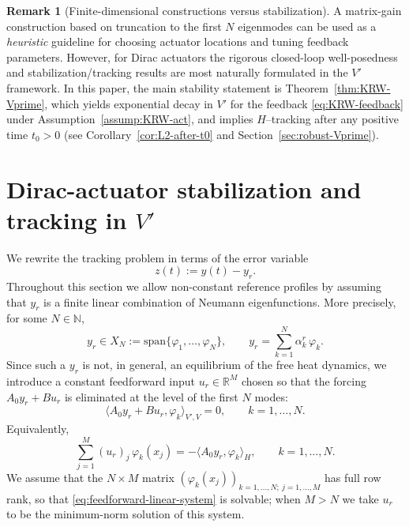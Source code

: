 \documentclass[11pt,a4paper]{article}
\numberwithin{equation}{section}
\theoremstyle{definition}
\newtheorem{remark}[theorem]{Remark}
\newcommand{\R}{\mathbb{R}}
\newcommand{\N}{\mathbb{N}}
\newcommand{\1}{\mathbbm{1}}
\begin{document}

\begin{remark}[Finite-dimensional constructions versus stabilization]
\label{rem:finite-vs-krw}
A matrix-gain construction based on truncation to the first $N$ eigenmodes can be used as a
\emph{heuristic} guideline for choosing actuator locations and tuning feedback parameters.
However, for Dirac actuators the rigorous closed-loop well-posedness and stabilization/tracking
results are most naturally formulated in the $V'$ framework. In this paper, the main stability
statement is Theorem~\ref{thm:KRW-Vprime}, which yields exponential decay in $V'$ for the
feedback \eqref{eq:KRW-feedback} under Assumption~\ref{assump:KRW-act}, and implies $H$--tracking
after any positive time $t_0>0$ (see Corollary~\ref{cor:L2-after-t0} and Section~\ref{sec:robust-Vprime}).
\end{remark}

\section{Dirac-actuator stabilization and tracking in $V'$}
\label{sec:stab-KRW}
\noindent
We rewrite the tracking problem in terms of the error variable
\[
z(t):=y(t)-y_r.
\]
Throughout this section we allow non-constant reference profiles by assuming that $y_r$ is a finite
linear combination of Neumann eigenfunctions. More precisely, for some $N\in\N$,
\begin{equation}
\label{eq:ref-finite-modes}
y_r\in X_N:=\mathrm{span}\{\varphi_1,\dots,\varphi_N\},\qquad
y_r=\sum_{k=1}^N \alpha_k^r\,\varphi_k.
\end{equation}
Since such a $y_r$ is not, in general, an equilibrium of the free heat dynamics, we introduce a constant
feedforward input $u_r\in\R^M$ chosen so that the forcing $A_0y_r+Bu_r$ is eliminated at the level of
the first $N$ modes:
\begin{equation}
\label{eq:feedforward-moment}
\langle A_0 y_r + Bu_r,\varphi_k\rangle_{V',V}=0,\qquad k=1,\dots,N.
\end{equation}
Equivalently,
\begin{equation}
\label{eq:feedforward-linear-system}
\sum_{j=1}^M (u_r)_j\,\varphi_k(x_j) = -\langle A_0 y_r,\varphi_k\rangle_H,\qquad k=1,\dots,N.
\end{equation}
We assume that the $N\times M$ matrix $(\varphi_k(x_j))_{k=1,\dots,N;\ j=1,\dots,M}$ has full row rank,
so that \eqref{eq:feedforward-linear-system} is solvable; when $M>N$ we take $u_r$ to be the minimum-norm
solution of this system.
\end{document}
